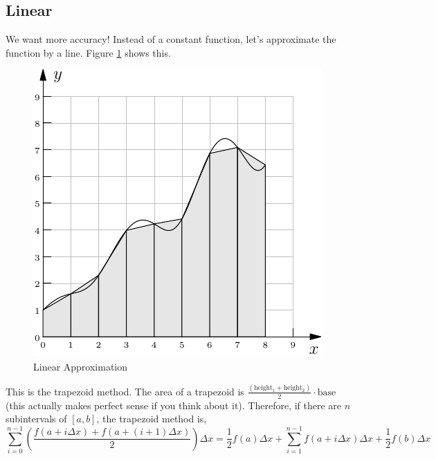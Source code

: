 \documentclass[11pt,letterpaper]{article}
\begin{document}
\subsection{Linear}
We want more accuracy! Instead of a constant function, let's approximate the function by a line.
Figure \ref{fig:trap} shows this.
\begin{figure}[!ht]
 \centering
 \includegraphics{images/fun_trap.pdf}
 \caption{Linear Approximation}
 \label{fig:trap}
\end{figure}

This is the trapezoid method. The area of a trapezoid is 
$\frac{(\text{height}_1+\text{height}_2)}{2}\cdot \text{base}$ (this actually makes perfect sense
if you think about it). Therefore, if there are $n$ subintervals of $[a,b]$, the trapezoid method
is,
\[
\sum_{i=0}^{n-1}\left(\frac{f(a+i\Delta x)+f(a+(i+1)\Delta x)}{2}\right)\Delta x = 
\frac12 f(a)\Delta x + \sum_{i=1}^{n-1} f(a+i\Delta x)\Delta x + \frac12 f(b)\Delta x
\]
\end{document}

